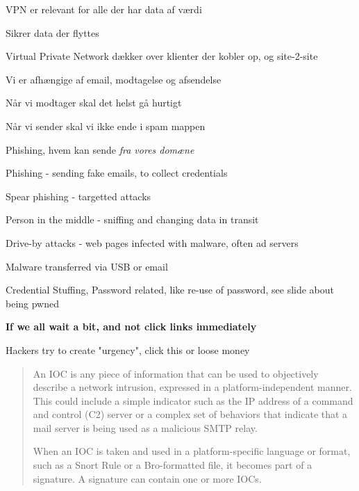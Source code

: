 \documentclass[Screen16to9,17pt]{foils}
\begin{document}


\begin{list2}
\item VPN er relevant for alle der har data af værdi
\item Sikrer data der flyttes
\item Virtual Private Network dækker over klienter der kobler op, og site-2-site
\end{list2}




\begin{list2}
\item Vi er afhængige af email, modtagelse og afsendelse
\item Når vi modtager skal det helst gå hurtigt
\item Når vi sender skal vi ikke ende i spam mappen
\item Phishing, hvem kan sende \emph{fra vores domæne}
\end{list2}



\begin{list2}
\item Phishing - sending fake emails, to collect credentials
\item Spear phishing - targetted attacks
\item Person in the middle - sniffing and changing data in transit
\item Drive-by attacks - web pages infected with malware, often ad servers
\item Malware transferred via USB or email
\item Credential Stuffing, Password related, like re-use of password, see slide about being pwned
\end{list2}

\vskip 1cm
\centerline{\Large\bf If we all wait a bit, and not click links immediately}

\vskip 1cm
Hackers try to create "urgency", click this or loose money



\begin{quote}
An IOC is any piece of information that can be used to objectively describe a
network intrusion, expressed in a platform-independent manner. This could include a simple indicator such as the IP address of a command and control (C2) server or a complex set of behaviors that indicate that a mail server is being used as a malicious SMTP relay.

When an IOC is taken and used in a platform-specific language or format, such as a Snort Rule or a Bro-formatted file, it becomes part of a signature. A signature can contain one or more IOCs.
\end{quote}
\end{document}
